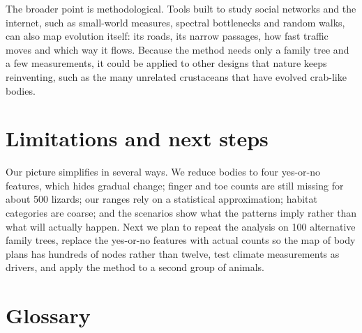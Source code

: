 \documentclass[11pt]{article}
\begin{document}
The broader point is methodological. Tools built to study social networks and the internet, such as small-world measures, spectral bottlenecks and random walks, can also map evolution itself: its roads, its narrow passages, how fast traffic moves and which way it flows. Because the method needs only a family tree and a few measurements, it could be applied to other designs that nature keeps reinventing, such as the many unrelated crustaceans that have evolved crab-like bodies.

\section{Limitations and next steps}

Our picture simplifies in several ways. We reduce bodies to four yes-or-no features, which hides gradual change; finger and toe counts are still missing for about 500 lizards; our ranges rely on a statistical approximation; habitat categories are coarse; and the scenarios show what the patterns imply rather than what will actually happen. Next we plan to repeat the analysis on 100 alternative family trees, replace the yes-or-no features with actual counts so the map of body plans has hundreds of nodes rather than twelve, test climate measurements as drivers, and apply the method to a second group of animals.

\section*{Glossary}
\end{document}
